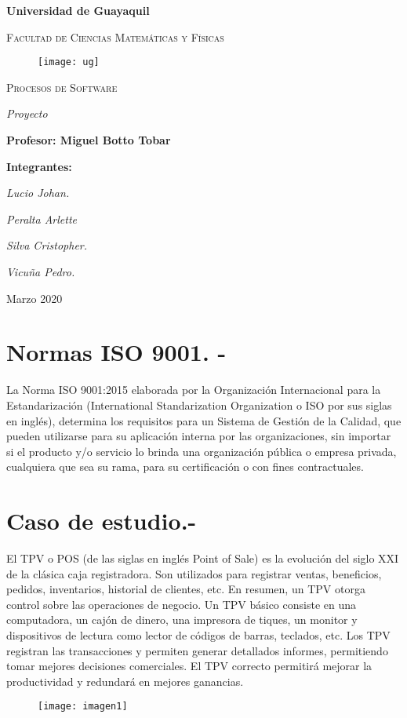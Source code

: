 \documentclass[11 pt]{article}
\begin{document}
\begin{titlepage}
	\centering
	{\bfseries\LARGE Universidad de Guayaquil \par}
	\vspace{1cm}
	{\scshape\Large Facultad de Ciencias Matemáticas y Físicas \par}
	\begin{figure}[h]
		\centering
		\texttt{[image: ug]}
	\end{figure}
	
	{\scshape\Huge Procesos de Software\par}
	\vspace{1.5cm}
	{\itshape\Large Proyecto\par}
	\vfill
	{\Large \textbf{Profesor: Miguel Botto Tobar}  \par}
	\vfill
	{\Large \textbf{Integrantes:} \par}
	{\itshape\Large Lucio Johan.\par}
    {\itshape\Large Peralta Arlette\par}
    {\itshape\Large Silva Cristopher.\par}
    {\itshape\Large Vicuña Pedro.\par}

	\vfill
	{\Large Marzo 2020\par}
\end{titlepage}
\tableofcontents

\newpage


	
\section{Normas ISO 9001. -}
La Norma ISO 9001:2015 elaborada por la Organización Internacional para la Estandarización (International Standarization Organization o ISO por sus siglas en inglés), determina los requisitos para un Sistema de Gestión de la Calidad, que pueden utilizarse para su aplicación interna por las organizaciones, sin importar si el producto y/o servicio lo brinda una organización pública o empresa privada, cualquiera que sea su rama, para su certificación o con fines contractuales.
\vspace{1cm}
\section{Caso de estudio.-}
El TPV o POS (de las siglas en inglés Point of Sale) es la evolución del siglo XXI de la clásica caja registradora. Son utilizados para registrar ventas, beneficios, pedidos, inventarios, historial de clientes, etc. En resumen, un TPV otorga control sobre las operaciones de negocio.
Un TPV básico consiste en una computadora, un cajón de dinero, una impresora de tiques, un monitor y dispositivos de lectura como lector de códigos de barras, teclados, etc. Los TPV registran las transacciones y permiten generar detallados informes, permitiendo tomar mejores decisiones comerciales. El TPV correcto permitirá mejorar la productividad y redundará en mejores ganancias.
\begin{figure}[h]
	\centering
	\texttt{[image: imagen1]}
\end{figure}
\end{document}
